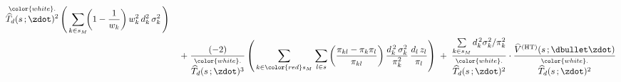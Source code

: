 \begin{lemma}
\begin{enumerate}
\begin{eqnarray*}
{{            \overset{{\color{white}.}}{
                \widehat{T}_{d}(s\,;\zdot)^{2}
                }
            }
        \left(\,
            \underset{k \in s_{M}}{\sum}\!\!
            \left(1-\dfrac{1}{w_{k}}\right)
            w_{k}^{2}\,d_{k}^{2}\,\sigma_{k}^{2}
            \,\right)
        }
    \\
    &&
        \; + \;
        \dfrac{
            (-2)
            }{
            \overset{{\color{white}.}}{
                \widehat{T}_{d}(s\,;\zdot)^{3}
                }
            }
        \left(\,
            \underset{k \in {\color{red}s_{M}}}{\sum}\;
            \underset{l \in s}{\sum}
                \left(\dfrac{\pi_{kl}-\pi_{k}\pi_{l}}{\pi_{kl}}\right)
                \dfrac{d_{k}^{\,2}\,\sigma^{2}_{k}}{\pi_{k}^{2}}\,
                \dfrac{d_{l}\,z_{l}}{\pi_{l}}
            \right)
        \; + \;
        \dfrac{
            \underset{k \in s_{M}}{\sum}\,d_{k}^{\,2}\sigma^{2}_{k}/\pi_{k}^{2}
            }{
            \overset{{\color{white}.}}{
                \widehat{T}_{d}(s\,;\zdot)^{2}
                }
            }
        \cdot
        \dfrac{
            \widehat{V}^{\textnormal{(HT)}}(s\,;\dbullet\zdot)
            }{
            \overset{{\color{white}.}}{
                \widehat{T}_{d}(s\,;\zdot)^{2}
                }
            }
    \end{eqnarray*}
\end{enumerate}
\end{lemma}
\proof
\renewcommand{\theenumi}{\roman{enumi}}
\renewcommand{\labelenumi}{\mbox{}\;\;\,(\theenumi)$\quad$}

